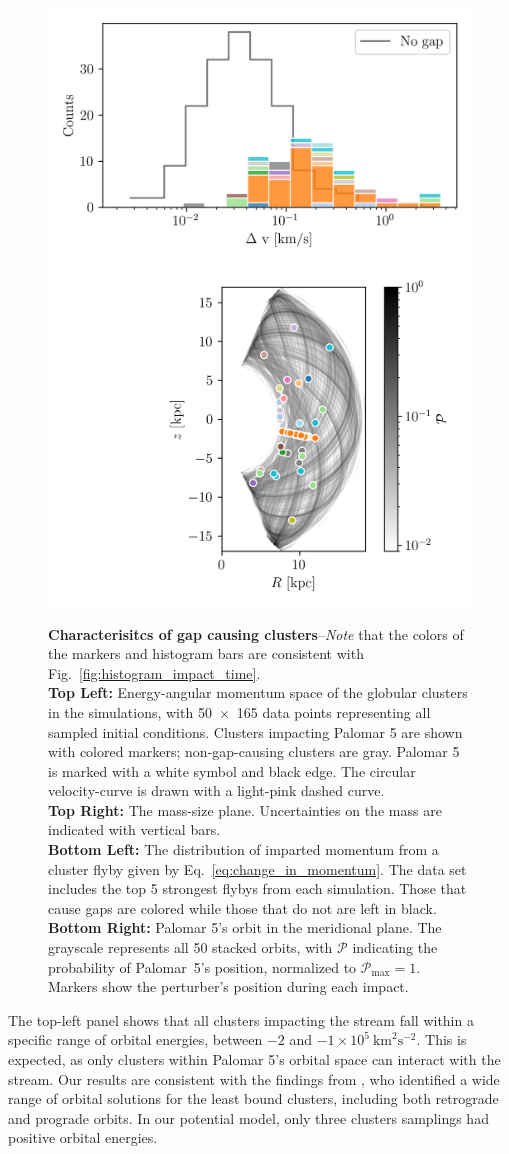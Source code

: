 \documentclass{aa}
\begin{document}
\begin{figure}
      \includegraphics[width=0.45\linewidth]{impact_geometry_statistics_deltaP.png}
      \includegraphics[width=0.45\linewidth]{impact_stats_phase_space.png}
      \caption{\textbf{Characterisitcs of gap causing clusters}--\textit{Note} that the colors of the markers and histogram bars are consistent with Fig.~\ref{fig:histogram_impact_time}.\\ \textbf{Top Left:} Energy-angular momentum space of the globular clusters in the simulations, with 50~$\times$~165 data points representing all sampled initial conditions. Clusters impacting Palomar 5 are shown with colored markers; non-gap-causing clusters are gray. Palomar 5 is marked with a white symbol and black edge. The circular velocity-curve is drawn with a light-pink dashed curve.\\ \textbf{Top Right:} The mass-size plane. Uncertainties on the mass are indicated with vertical bars. \\ \textbf{Bottom Left:} The distribution of imparted momentum from a cluster flyby given by Eq.~\ref{eq:change_in_momentum}. The data set includes the top 5 strongest flybys from each simulation. Those that cause gaps are colored while those that do not are left in black. \\ \textbf{Bottom Right:} Palomar 5's orbit in the meridional plane. The grayscale represents all 50 stacked orbits, with $\mathcal{P}$ indicating the probability of  Palomar~5's position, normalized to $\mathcal{P}_\textrm{max}=1$. Markers show the perturber's position during each impact.}
      \label{fig:mass_size_plane}
      \end{figure}

    The top-left panel shows that all clusters impacting the stream fall within a specific range of orbital energies, between $-2$ and $-1 \times10^5~\textrm{km}^2\textrm{s}^{-2}$. This is expected, as only clusters within Palomar 5's orbital space can interact with the stream. Our results are consistent with the findings from \citet{2021MNRAS.505.5978V}, who identified a wide range of orbital solutions for the least bound clusters, including both retrograde and prograde orbits. In our potential model, only three clusters samplings had positive orbital energies.
    
\end{document}
